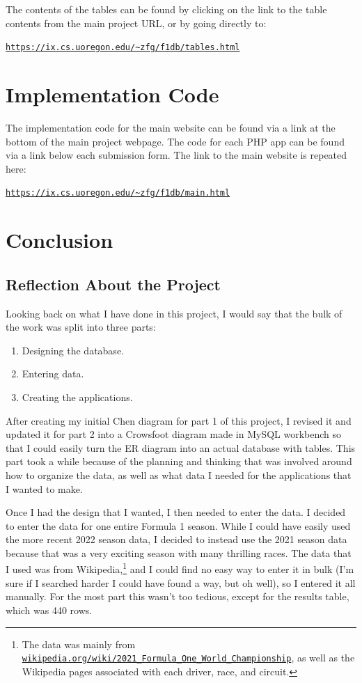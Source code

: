 \documentclass{article} %
\begin{document}
The contents of the tables can be found by clicking on the link to the
table contents from the main project URL, or by going directly to:

\noindent
\href{https://ix.cs.uoregon.edu/~zfg/f1db/tables.html}{\texttt{https://ix.cs.uoregon.edu/\~{}zfg/f1db/tables.html}}

\section{Implementation Code}

The implementation code for the main website can be found via a link at
the bottom of the main project webpage. The code for each PHP app can be
found via a link below each submission form. The link to the main
website is repeated here:

\noindent
\href{https://ix.cs.uoregon.edu/~zfg/f1db/main.html}{\texttt{https://ix.cs.uoregon.edu/\~{}zfg/f1db/main.html}}


\section{Conclusion}

\subsection{Reflection About the Project}

Looking back on what I have done in this project, I would say that the
bulk of the work was split into three parts:
\begin{enumerate}[label=(\arabic*)]
    \item Designing the database.
    \item Entering data.
    \item Creating the applications.
\end{enumerate}

After creating my initial Chen diagram for part 1 of this project, I
revised it and updated it for part 2 into a Crowsfoot diagram made in
MySQL workbench so that I could easily turn the ER diagram into an
actual database with tables. This part took a while because of the
planning and thinking that was involved around how to organize the data,
as well as what data I needed for the applications that I wanted to
make.
\medskip

Once I had the design that I wanted, I then needed to enter the data. I
decided to enter the data for one entire Formula 1 season. While I could
have easily used the more recent 2022 season data, I decided to instead
use the 2021 season data because that was a very exciting season with
many thrilling races. The data that I used was from
Wikipedia,\footnote{The data was mainly from 
\href{https://en.wikipedia.org/wiki/2021_Formula_One_World_Championship}
{\texttt{wikipedia.org/wiki/2021\_Formula\_One\_World\_Championship}},
as well as the Wikipedia pages associated with each driver, race, and
circuit.} and I could find no easy way to enter it in bulk (I'm sure if
I searched harder I could have found a way, but oh well), so I entered
it all manually. For the most part this wasn't too tedious, except for
the results table, which was 440 rows.
\medskip
\end{document}
